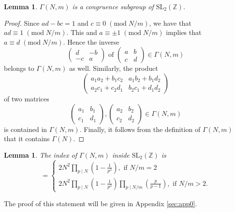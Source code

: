 \documentclass{article}
\newtheorem{lemma}[theorem]{Lemma}
\theoremstyle{definition}
\newcommand{\ZZ} {{\mathbb Z}}		%
\begin{document}
\begin{lemma} $\Gamma(N,m)$ is a congruence subgroup of $\mathrm{SL_2}( \ZZ)$.
\end{lemma}
\begin{proof}
Since $ad-bc=1$ and $c\equiv 0  \;(\mathrm{mod}\;N/m)$, we have that 
$ad\equiv 1  \;(\mathrm{mod}\;N/m)$. This and $a \equiv \pm 1 \;(\mathrm{mod}\;N/m)$ 
implies that $a\equiv d  \;(\mathrm{mod}\;N/m)$. Hence the inverse
\[\begin{pmatrix} d & -b \\ -c & a \end{pmatrix} \textrm{ of }
 \begin{pmatrix} a & b \\ c & d \end{pmatrix} \in \Gamma(N,m)\]
belongs to $\Gamma(N,m)$ as well. 
Similarly, the product
\[ 
\begin{pmatrix} a_1a_2+b_1c_2 & a_1b_2+b_1d_2 \\ a_2c_1+c_2d_1 & b_2c_1+d_1d_2 \end{pmatrix}
\]
 of two matrices 
\[\begin{pmatrix} a_1 & b_1 \\ c_1 & d_1 \end{pmatrix}, 
\begin{pmatrix} a_2 & b_2 \\ c_2 & d_2 \end{pmatrix} \in \Gamma(N,m) \]
is contained in $\Gamma(N,m)$. Finally, it follows from the definition of 
$\Gamma(N,m)$ that it contains $\Gamma(N)$.
\end{proof}
\begin{lemma}
	\label{lem:indgNmsl2}
	The index of $\Gamma(N,m)$ inside $\mathrm{SL}_2( \ZZ)$ is
	\begin{equation*} [\mathrm{SL}_2( \ZZ) \, : \, \Gamma(N,m) ] = \begin{cases} 
	2N^2\prod_{p \mid N}\left(1-\frac{1}{p^2} \right),\textrm{ if } N/m =2 \\
	2N^2\prod_{p \mid N}\left(1-\frac{1}{p^2} \right) 
	\prod_{p \mid N/m }\left(\frac{p}{p-1} \right),\textrm{ if } N/m >2.
	\end{cases}
	\end{equation*}
\end{lemma}
The proof of this statement will be given in Appendix \ref{sec:app0}.

\end{document}
